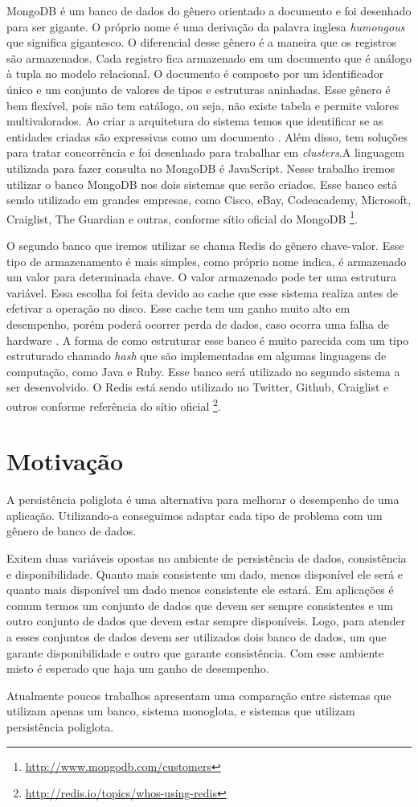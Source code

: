 MongoDB é um banco de dados do gênero orientado a documento e foi desenhado para ser gigante. O próprio nome é uma derivação da palavra inglesa \textit{humongous} que significa gigantesco. O diferencial desse gênero é a maneira que os registros são armazenados. Cada registro fica armazenado em um documento que é análogo à tupla no modelo relacional. O documento é composto por um identificador único e um conjunto de valores de tipos e estruturas aninhadas. Esse gênero é bem flexível, pois não tem catálogo, ou seja, não existe tabela e permite valores multivalorados. Ao criar a arquitetura do sistema temos que identificar se as entidades criadas são expressivas como um documento \cite{SDSW}. Além disso, tem soluções para tratar concorrência e foi desenhado para trabalhar em \textit{clusters}.A linguagem utilizada para fazer consulta no MongoDB é JavaScript. Nesse trabalho iremos utilizar o banco MongoDB nos dois sistemas que serão criados. Esse banco está sendo utilizado em grandes empresas, como Cisco, eBay, Codeacademy, Microsoft, Craiglist, The Guardian e outras, conforme sítio oficial do MongoDB \footnote{\url{http://www.mongodb.com/customers}}.

O segundo banco que iremos utilizar se chama \ac{Redis} do gênero chave-valor. Esse tipo de armazenamento é mais simples, como próprio nome indica, é armazenado um valor para determinada chave. O valor armazenado pode ter uma estrutura variável. Essa escolha foi feita devido ao cache que esse sistema realiza antes de efetivar a operação no disco. Esse cache tem um ganho muito alto em desempenho, porém poderá ocorrer perda de dados, caso ocorra uma falha de hardware \cite{SDSW}. A forma de como estruturar esse banco é muito parecida com um tipo estruturado chamado \textit{hash} que são implementadas em algumas linguagens de computação, como Java e Ruby. Esse banco será utilizado no segundo sistema a ser desenvolvido. O \ac{Redis} está sendo utilizado no Twitter, Github, Craiglist e outros conforme referência do sítio oficial \footnote{\url{http://redis.io/topics/whos-using-redis}}.


\section{Motivação}
\label{sec:motivacao}
A persistência poliglota é uma alternativa para melhorar o desempenho de uma aplicação. Utilizando-a conseguimos adaptar cada tipo de problema com um gênero de banco de dados.

Exitem duas variáveis opostas no ambiente de persistência de dados, consistência e disponibilidade. Quanto mais consistente um dado, menos disponível ele será e quanto mais disponível um dado menos consistente ele estará. Em aplicações é comum termos um conjunto de dados que devem ser sempre consistentes e um outro conjunto de dados que devem estar sempre disponíveis. Logo, para atender a esses conjuntos de dados devem ser utilizados dois banco de dados, um que garante disponibilidade e outro que garante  consistência. Com esse ambiente misto é esperado que haja um ganho de desempenho.

Atualmente poucos trabalhos apresentam uma comparação entre sistemas que utilizam apenas um banco, sistema monoglota,  e sistemas que utilizam persistência poliglota.





